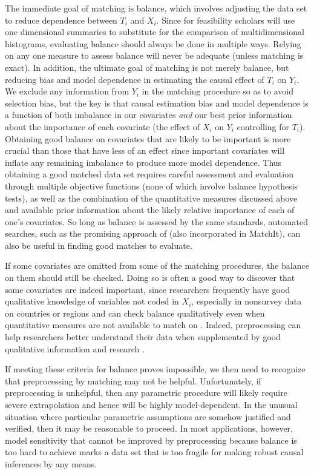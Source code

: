 \documentclass[11pt,titlepage]{article}
\begin{document}
The immediate goal of matching is balance, which involves adjusting
the data set to reduce dependence between $T_i$ and $X_i$.  Since for
feasibility scholars will use one dimensional summaries to substitute
for the comparison of multidimensional histograms, evaluating balance
should always be done in multiple ways.  Relying on any one measure to
assess balance will never be adequate (unless matching is exact).  In
addition, the ultimate goal of matching is not merely balance, but
reducing bias and model dependence in estimating the causal effect of
$T_i$ on $Y_i$.  We exclude any information from $Y_i$ in the matching
procedure so as to avoid selection bias, but the key is that causal
estimation bias and model dependence is a function of both imbalance
in our covariates \emph{and} our best prior information about the
importance of each covariate (the effect of $X_i$ on $Y_i$ controlling
for $T_i$).  Obtaining good balance on covariates that are likely to
be important is more crucial than those that have less of an effect
since important covariates will inflate any remaining imbalance to
produce more model dependence.  Thus obtaining a good matched data set
requires careful assessment and evaluation through multiple objective
functions (none of which involve balance hypothesis tests), as well as
the combination of the quantitative measures discussed above and
available prior information about the likely relative importance of
each of one's covariates.  So long as balance is assessed by the same
standards, automated searches, such as the promising approach of
\citet{DiaSek05} (also incorporated in MatchIt), can also be useful in
finding good matches to evaluate.

If some covariates are omitted from some of the matching procedures,
the balance on them should still be checked.  Doing so is often a good
way to discover that some covariates are indeed important, since
researchers frequently have good qualitative knowledge of variables
not coded in $X_i$, especially in nonsurvey data on countries or
regions and can check balance qualitatively even when quantitative
measures are not available to match on \citep[][Ch.3]{Rosenbaum02}.
Indeed, preprocessing can help researchers better understand their
data when supplemented by good qualitative information and research
\citep[e.g.,][]{RosSil01}.

If meeting these criteria for balance proves impossible, we then need
to recognize that preprocessing by matching may not be helpful.
Unfortunately, if preprocessing is unhelpful, then any parametric
procedure will likely require severe extrapolation and hence will be
highly model-dependent.  In the unusual situation where particular
parametric assumptions are somehow justified and verified, then it may
be reasonable to proceed.  In most applications, however, model
sensitivity that cannot be improved by preprocessing because balance
is too hard to achieve marks a data set that is too fragile for making
robust causal inferences by any means.
\end{document}

